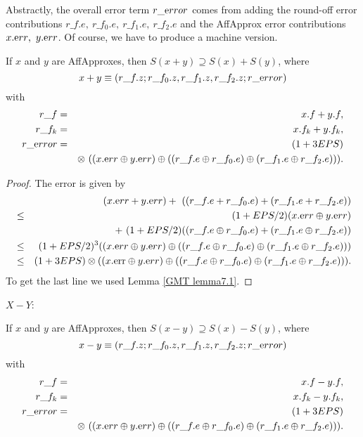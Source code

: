 Abstractly, the overall error term $r\_{\textrm error}$ comes from adding the round-off error contributions $r\_f.e,\  r\_f_0.e,\  r\_f_1.e, 
\ r\_f_2.e$ and the AffApprox error contributions $x.{\textrm err},\  y.{\textrm err}$.  Of course, we have to produce a machine version.

\begin{proposition}\label{GMT prop8.2} If $x$ and $y$ are 
{\textrm AffApproxes, }
then $S(x + y) \supseteq S(x) + S(y)${\textrm ,} where
$$x + y \equiv (r\_f.z; r\_f_0.z, r\_f_1.z, r\_f_2.z; r\_{\textrm error})$$
with
\begin{eqnarray*}
r\_f &=& x.f + y.f,\\
r\_f_k &=& x.f_k + y.f_k,\\
r\_{\textrm error}& =& (1 + 3EPS)\\
&&\otimes\ ((x.{\textrm err} \oplus y.{\textrm err}) \oplus ((r\_f.e \oplus
r\_f_0.e) \oplus (r\_f_1.e \oplus r\_f_2.e))).
\end{eqnarray*}
\end{proposition}

\begin{proof}{}
The error is given by 
\begin{eqnarray*}
&&\hskip-24pt (x.{\textrm err} + y.{\textrm err})  +\ ((r\_f.e + r\_f_0.e) + (r\_f_1.e + r\_f_2.e))\\
&\le& (1+EPS/2) (x.{\textrm err} \oplus
y.{\textrm err}) \\
&&+\ (1+EPS/2)((r\_f.e \oplus r\_f_0.e) + (r\_f_1.e \oplus r\_f_2.e))\\
&\le& (1+EPS/2)^3 ((x.{\textrm err} \oplus
y.{\textrm err}) \oplus ((r\_f.e \oplus r\_f_0.e) \oplus (r\_f_1.e \oplus r\_f_2.e)))\\
&\le& (1 + 3EPS) \otimes ((x.\mathrm {err} \oplus y.{\textrm err}) \oplus ((r\_f.e \oplus r\_f_0.e) \oplus (r\_f_1.e \oplus r\_f_2.e))).
\end{eqnarray*}
 To get the last line
we used Lemma \ref{GMT lemma7.1}. \end{proof}

$X - Y$:

\begin{proposition}\label{GMT prop8.3} If $x$ and $y$ are {\textrm AffApproxes,} then $S(x - y) \supseteq S(x) - S(y)${\textrm ,}
 where
$$x - y \equiv (r\_f.z; r\_f_0.z, r\_f_1.z, r\_f_2.z; r\_{\textrm error})$$
with
\begin{eqnarray*}
r\_f& =& x.f - y.f,\\
r\_f_k &= &x.f_k - y.f_k,\\
r\_{\textrm error} &=& (1 + 3EPS)\\
&& \otimes\ ((x.{\textrm err} \oplus y.{\textrm err}) \oplus ((r\_f.e
\oplus r\_f_0.e) \oplus (r\_f_1.e \oplus r\_f_2.e))).
\end{eqnarray*}
\end{proposition}

